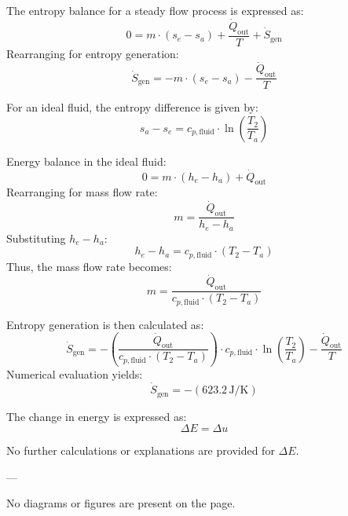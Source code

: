 The entropy balance for a steady flow process is expressed as:  
\[
0 = m \cdot (s_e - s_a) + \frac{\dot{Q}_{\text{out}}}{T} + \dot{S}_{\text{gen}}
\]  
Rearranging for entropy generation:  
\[
\dot{S}_{\text{gen}} = -m \cdot (s_e - s_a) - \frac{\dot{Q}_{\text{out}}}{T}
\]  

For an ideal fluid, the entropy difference is given by:  
\[
s_a - s_e = c_{p,\text{fluid}} \cdot \ln \left( \frac{T_2}{T_a} \right)
\]  

Energy balance in the ideal fluid:  
\[
0 = m \cdot (h_e - h_a) + \dot{Q}_{\text{out}}
\]  
Rearranging for mass flow rate:  
\[
m = \frac{\dot{Q}_{\text{out}}}{h_e - h_a}
\]  
Substituting \( h_e - h_a \):  
\[
h_e - h_a = c_{p,\text{fluid}} \cdot (T_2 - T_a)
\]  
Thus, the mass flow rate becomes:  
\[
m = \frac{\dot{Q}_{\text{out}}}{c_{p,\text{fluid}} \cdot (T_2 - T_a)}
\]  

Entropy generation is then calculated as:  
\[
\dot{S}_{\text{gen}} = -\left( \frac{\dot{Q}_{\text{out}}}{c_{p,\text{fluid}} \cdot (T_2 - T_a)} \right) \cdot c_{p,\text{fluid}} \cdot \ln \left( \frac{T_2}{T_a} \right) - \frac{\dot{Q}_{\text{out}}}{T}
\]  
Numerical evaluation yields:  
\[
\dot{S}_{\text{gen}} = -(623.2 \, \text{J/K})
\]

The change in energy is expressed as:  
\[
\Delta E = \Delta u
\]  

No further calculations or explanations are provided for \( \Delta E \).  

---

No diagrams or figures are present on the page.